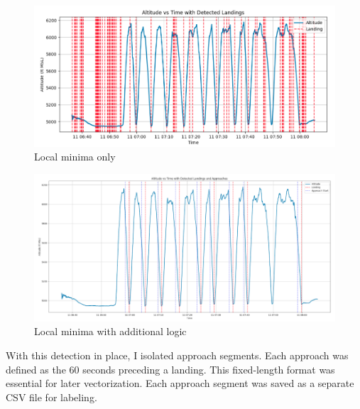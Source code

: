 \documentclass[conference]{IEEEtran}
\begin{document}
\begin{figure}[H]
    \centerline{\includegraphics[width=\linewidth]{local_minima_only.png}}
    \caption{Local minima only}
\end{figure}

\begin{figure}[H]
    \centerline{\includegraphics[width=\linewidth]{additional_logic1.png}}
    \caption{Local minima with additional logic}
\end{figure}

With this detection in place, I isolated approach segments. Each approach was defined as the 60 seconds preceding a landing. This fixed-length format was essential for later vectorization. Each approach segment was saved as a separate CSV file for labeling.
\end{document}
